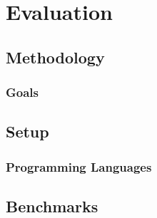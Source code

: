 \chapter{Evaluation}
\label{chap:evalution}




\section{Methodology}
\label{sec:methodology}

\subsection{Goals}
\label{subsec:goals}

\section{Setup}
\label{sec:setup}


\subsection{Programming Languages}
\label{subsec:programming-languages}

\section{Benchmarks}
\label{sec:benchmarks}




